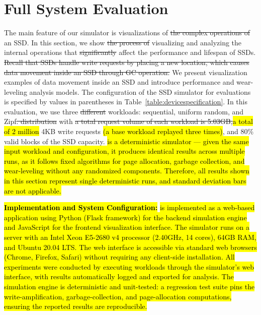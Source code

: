 \documentclass{ieeeaccess}
\begin{document}
\section{Full System Evaluation}
\label{full_system_evaluation}
The main feature of our simulator is visualizations of \sout{the complex operations of} an SSD.
In this section, we show \sout{the process of} visualizing and analyzing the internal operations that \sout{significantly} affect the performance and lifespan of SSDs.
\sout{Recall that SSDs handle write requests by placing a new location, which causes data movement inside an SSD through GC operation.}
We present visualization examples of data movement inside an SSD and introduce performance and wear-leveling analysis models.
The configuration of the SSD simulator for evaluations is specified by values in parentheses in Table~\ref{table:devicespecification}.
In this evaluation, we use three \sout{different} workloads: sequential, uniform random, and Zipf\sout{. distribution} with \sout{a total request volume of each workload is 5.03GB,}\hl{a total of 2 million} 4KB write requests \hl{(a base workload replayed three times)}, and 80\% valid blocks of the SSD capacity. \eyanassdsim \hl{is a deterministic simulator --- given the same input workload and configuration, it produces identical results across multiple runs, as it follows fixed algorithms for page allocation, garbage collection, and wear-leveling without any randomized components. Therefore, all results shown in this section represent single deterministic runs, and standard deviation bars are not applicable.}

\hl{\textbf{Implementation and System Configuration:}} \eyanassdsim \hl{is implemented as a web-based application using Python (Flask framework) for the backend simulation engine and JavaScript for the frontend visualization interface. The simulator runs on a server with an Intel Xeon E5-2680 v4 processor (2.40GHz, 14 cores), 64GB RAM, and Ubuntu 20.04 LTS. The web interface is accessible via standard web browsers (Chrome, Firefox, Safari) without requiring any client-side installation. All experiments were conducted by executing workloads through the simulator's web interface, with results automatically logged and exported for analysis. The simulation engine is deterministic and unit-tested: a regression test suite pins the write-amplification, garbage-collection, and page-allocation computations, ensuring the reported results are reproducible.}
\end{document}
